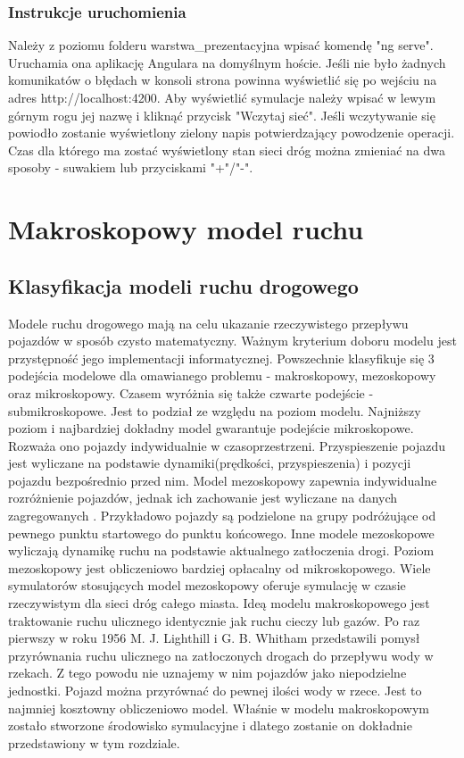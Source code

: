 \documentclass[12pt]{book}
\theoremstyle{plain}
\begin{document}
\subsection{Instrukcje uruchomienia}
Należy z poziomu folderu warstwa\_prezentacyjna wpisać komendę "ng serve". Uruchamia ona aplikację Angulara na domyślnym hoście. Jeśli nie było żadnych komunikatów o błędach w konsoli strona powinna wyświetlić się po wejściu na adres http://localhost:4200. Aby wyświetlić symulacje należy wpisać w lewym górnym rogu jej nazwę i kliknąć przycisk "Wczytaj sieć". Jeśli wczytywanie się powiodło zostanie wyświetlony zielony napis potwierdzający powodzenie operacji. Czas dla którego ma zostać wyświetlony stan sieci dróg można zmieniać na dwa sposoby - suwakiem lub przyciskami "+"/"-".

\chapter{Makroskopowy model ruchu} \label{chapter:makroskopowy_model_ruchu}
\section{Klasyfikacja modeli ruchu drogowego}
Modele ruchu drogowego mają na celu ukazanie rzeczywistego przepływu pojazdów w sposób czysto matematyczny. Ważnym kryterium doboru modelu jest przystępność jego implementacji informatycznej. Powszechnie klasyfikuje się 3 podejścia modelowe dla omawianego problemu \cite{CompareModels} - makroskopowy, mezoskopowy oraz mikroskopowy. Czasem \cite{multilevel} wyróżnia się także czwarte podejście - submikroskopowe. Jest to podział ze względu na poziom modelu. Najniższy poziom i najbardziej dokładny model gwarantuje podejście mikroskopowe. Rozważa ono pojazdy indywidualnie w czasoprzestrzeni. Przyspieszenie pojazdu jest wyliczane na podstawie dynamiki(prędkości, przyspieszenia) i pozycji pojazdu bezpośrednio przed nim. Model mezoskopowy zapewnia indywidualne rozróżnienie pojazdów, jednak ich zachowanie jest wyliczane na danych zagregowanych \cite{mesoscopic}. Przykładowo pojazdy są podzielone na grupy podróżujące od pewnego punktu startowego do punktu końcowego. Inne modele \cite{mesoscopic2} mezoskopowe wyliczają dynamikę ruchu na podstawie aktualnego zatłoczenia drogi. Poziom mezoskopowy jest obliczeniowo bardziej opłacalny od mikroskopowego.
Wiele symulatorów stosujących model mezoskopowy oferuje symulację w czasie rzeczywistym dla sieci dróg całego miasta\cite{vu2017high}. Ideą modelu makroskopowego jest traktowanie ruchu ulicznego identycznie jak ruchu cieczy lub gazów. Po raz pierwszy w roku 1956 M. J. Lighthill i G. B. Whitham \cite{lwr} przedstawili pomysł przyrównania ruchu ulicznego na zatłoczonych drogach do przepływu wody w rzekach. Z tego powodu nie uznajemy w nim pojazdów jako niepodzielne jednostki. Pojazd można przyrównać do pewnej ilości wody w rzece.
Jest to najmniej kosztowny obliczeniowo model. Właśnie w modelu makroskopowym zostało stworzone środowisko symulacyjne i dlatego zostanie on dokładnie przedstawiony w tym rozdziale.
\end{document}
